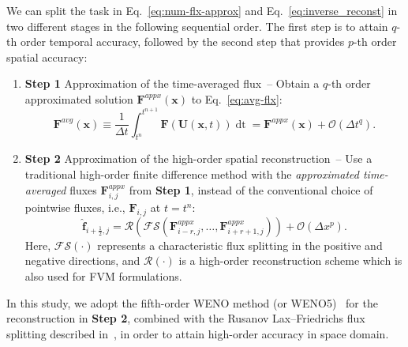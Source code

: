 \documentclass[times,preprint,3p]{elsarticle}
\newcommand{\bff}{\mathbf{f}}
\newcommand{\dt}{\Delta t}
\newcommand{\dx}{\Delta x}
\newcommand{\bF}{\mathbf{F}}
\newcommand{\bU}{\mathbf{U}}
\newcommand{\bx}{\mathbf{x}}
\begin{document}
We can split the task in Eq.~\eqref{eq:num-flx-approx} and Eq.~\eqref{eq:inverse_reconst}
in two different stages in the following sequential order.
The first step is to attain $q$-th order temporal accuracy,
followed by the second step that provides $p$-th order spatial accuracy:
%
\begin{enumerate}
    \item[] \textbf{Step 1}
     Approximation of the time-averaged flux~--
     Obtain a $q$-th order
     approximated solution $\bF^{appx}(\bx)$ to Eq.~\eqref{eq:avg-flx}:
        \begin{equation}\label{eq:approx-avg-flx}
        \bF^{avg} (\bx) \equiv \frac{1}{\dt} \int^{t^{n + 1}}_{t^{n}} \bF(\bU(\bx, t)) \mathop{dt}
            = \bF^{appx} (\bx)+ \mathcal{O}(\dt^{q}).
        \end{equation}
    \item[] \textbf{Step 2}
    Approximation of the high-order spatial reconstruction~--
    Use a traditional high-order finite difference method with the
    \textit{approximated time-averaged} fluxes $\bF^{appx}_{i,j}$ from \textbf{Step 1},
    instead of the conventional choice of pointwise fluxes, i.e., $\bF_{i,j}$ at $t=t^n$:
        \begin{equation}\label{eq:recons}
            \hat{\bff}_{i + \frac{1}{2}, j} =
            \mathcal{R}\left(\mathcal{FS}\left(\bF^{appx}_{i-r, j}, \dots,
                \bF^{appx}_{i+r+1, j} \right) \right)
            + \mathcal{O}(\dx^{p}).
        \end{equation}
    Here, \( \mathcal{FS}(\cdot) \) represents
    a characteristic flux splitting in the positive and negative directions, and
    \( \mathcal{R}(\cdot) \) is a high-order reconstruction scheme which is also used for
    FVM formulations.
\end{enumerate}
%
In this study, we adopt the fifth-order WENO method (or WENO5)~\cite{jiang1996efficient}
for the reconstruction in \textbf{Step 2},
combined with the Rusanov Lax–Friedrichs
flux splitting described in~\cite{mignone2010high}, in order to
attain high-order accuracy in space domain.
\end{document}
